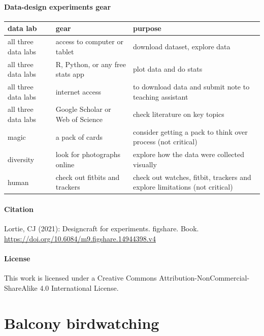 \documentclass[
]{book}
\begin{document}
\hypertarget{data-design-experiments-gear}{%
\subsubsection*{Data-design experiments gear}\label{data-design-experiments-gear}}

\begin{tabular}{lll}
\toprule
data lab & gear & purpose\\
\midrule
all three data labs & access to computer or tablet & download dataset, explore data\\
all three data labs & R, Python, or any free stats app & plot data and do stats\\
all three data labs & internet access & to download data and submit note to teaching assistant\\
all three data labs & Google Scholar or Web of Science & check literature on key topics\\
magic & a pack of cards & consider getting a pack to think over process (not critical)\\
\addlinespace
diversity & look for photographs online & explore how the data were collected visually\\
human & check out fitbits and trackers & check out watches, fitbit, trackers and explore limitations (not critical)\\
\bottomrule
\end{tabular}

\hypertarget{citation}{%
\subsubsection*{Citation}\label{citation}}

Lortie, CJ (2021): Designcraft for experiments. figshare. Book. \url{https://doi.org/10.6084/m9.figshare.14944398.v4}

\hypertarget{license}{%
\subsubsection*{License}\label{license}}

This work is licensed under a Creative Commons Attribution-NonCommercial-ShareAlike 4.0 International License.

\hypertarget{birds}{%
\chapter{Balcony birdwatching}\label{birds}}
\end{document}
